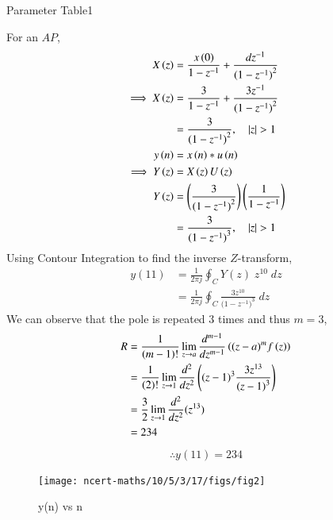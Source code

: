 \documentclass[journal,12pt,twocolumn]{IEEEtran}
\begin{document}
	\begin{table}[ht]
		\centering
		\def\arraystretch{1.5}
		
		\caption{Parameter Table1}
		\label{tab:10.5.3.17}
	\end{table}
	For an $AP$,
	\begin{align}
		X\left(z\right) &= \frac{ x\left(0\right) }{1-z^{-1}} + \frac{dz^{-1}}{{(1-z^{-1})}^{2}}    \\
		\implies X\left(z\right) &= \frac{3}{1-z^{-1}} + \frac{3z^{-1}}{{(1-z^{-1})}^{2}} \\
		&= \frac{3}{({1-z^{-1})}^{2}} ,\quad \left\vert z\right\vert>1    \\
		y\left(n\right)&=x\left(n\right)\ast u\left(n\right)\\
		\implies Y\left(z\right)&=X\left(z\right)U\left(z\right)   \\
		Y\left(z\right)&=\left(\frac{3}{({1-z^{-1})}^{2}}\right)\left(\frac{1}{1-z^{-1}}\right)  \\
		&=\frac{3}{({1-z^{-1})}^{3}} ,\quad \left\vert z\right\vert>1 
	\end{align}
	Using Contour Integration to find the inverse $Z$-transform,
	\begin{align}
		y(11)&=\frac{1}{2\pi j}\oint_{C}Y(z) \;z^{10} \;dz  \\
		&=\frac{1}{2\pi j}\oint_{C}\frac{3z^{10}}{({1-z^{-1})}^{3}} \;dz 
	\end{align}
	We can observe that the pole is repeated $3$ times and thus $m=3$,
	\begin{align}
		R&=\frac{1}{\left(m-1\right)!}\lim\limits_{z\to a}\frac{d^{m-1}}{dz^{m-1}}\left({(z-a)}^{m}f\left(z\right)\right)  \\
		&=\frac{1}{\left(2\right)!}\lim\limits_{z\to 1}\frac{d^{2}}{dz^{2}}\left({(z-1)}^{3}\frac{3z^{13}}{{(z-1)}^3}\right)   \\
		&=\frac{3}{2}\lim\limits_{z\to 1}\frac{d^2}{dz^2}(z^{13})   \\
		&=234
	\end{align}
	\begin{align}
		\therefore {y(11)=234}
	\end{align}
	\begin{figure}[ht]
		\texttt{[image: ncert-maths/10/5/3/17/figs/fig2]}
		\caption{y(n) vs n}
		\centering
		\label{fig:10.5.3.17}
	\end{figure}
\end{document}
